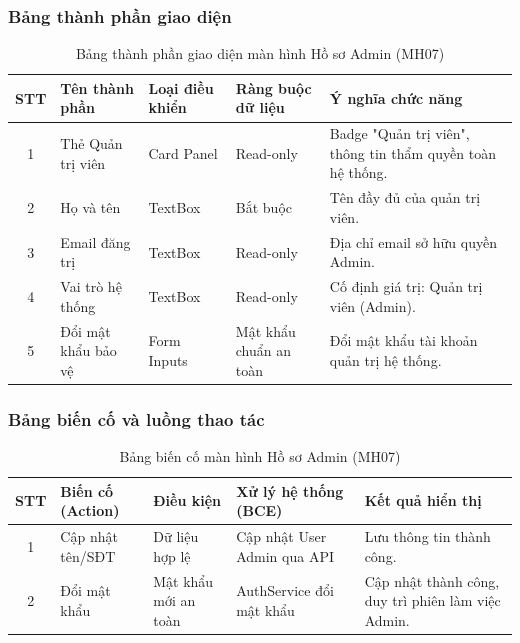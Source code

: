 \documentclass[12pt,a4paper]{report}
\begin{document}
\subsubsection{Bảng thành phần giao diện}
\begin{table}[H]
\centering
\small
\begin{tabularx}{\textwidth}{|c|l|l|l|X|}
\hline
\textbf{STT} & \textbf{Tên thành phần} & \textbf{Loại điều khiển} & \textbf{Ràng buộc dữ liệu} & \textbf{Ý nghĩa chức năng} \\ \hline
1 & Thẻ Quản trị viên & Card Panel & Read-only & Badge "Quản trị viên", thông tin thẩm quyền toàn hệ thống. \\ \hline
2 & Họ và tên & TextBox & Bắt buộc & Tên đầy đủ của quản trị viên. \\ \hline
3 & Email đăng trị & TextBox & Read-only & Địa chỉ email sở hữu quyền Admin. \\ \hline
4 & Vai trò hệ thống & TextBox & Read-only & Cố định giá trị: Quản trị viên (Admin). \\ \hline
5 & Đổi mật khẩu bảo vệ & Form Inputs & Mật khẩu chuẩn an toàn & Đổi mật khẩu tài khoản quản trị hệ thống. \\ \hline
\end{tabularx}
\caption{Bảng thành phần giao diện màn hình Hồ sơ Admin (MH07)}
\end{table}

\subsubsection{Bảng biến cố và luồng thao tác}
\begin{table}[H]
\centering
\small
\begin{tabularx}{\textwidth}{|c|l|l|X|X|}
\hline
\textbf{STT} & \textbf{Biến cố (Action)} & \textbf{Điều kiện} & \textbf{Xử lý hệ thống (BCE)} & \textbf{Kết quả hiển thị} \\ \hline
1 & Cập nhật tên/SĐT & Dữ liệu hợp lệ & Cập nhật User Admin qua API & Lưu thông tin thành công. \\ \hline
2 & Đổi mật khẩu & Mật khẩu mới an toàn & AuthService đổi mật khẩu & Cập nhật thành công, duy trì phiên làm việc Admin. \\ \hline
\end{tabularx}
\caption{Bảng biến cố màn hình Hồ sơ Admin (MH07)}
\end{table}

\end{document}
